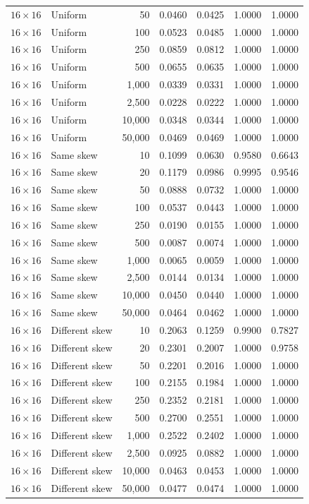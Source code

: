 \begin{longtable}{@{}llrrrrr@{}}
\(16\times16\) & Uniform & 50 & 0.0460 & 0.0425 & 1.0000 & 1.0000\\
\(16\times16\) & Uniform & 100 & 0.0523 & 0.0485 & 1.0000 & 1.0000\\
\(16\times16\) & Uniform & 250 & 0.0859 & 0.0812 & 1.0000 & 1.0000\\
\(16\times16\) & Uniform & 500 & 0.0655 & 0.0635 & 1.0000 & 1.0000\\
\(16\times16\) & Uniform & 1,000 & 0.0339 & 0.0331 & 1.0000 & 1.0000\\
\(16\times16\) & Uniform & 2,500 & 0.0228 & 0.0222 & 1.0000 & 1.0000\\
\(16\times16\) & Uniform & 10,000 & 0.0348 & 0.0344 & 1.0000 & 1.0000\\
\(16\times16\) & Uniform & 50,000 & 0.0469 & 0.0469 & 1.0000 & 1.0000\\
\(16\times16\) & Same skew & 10 & 0.1099 & 0.0630 & 0.9580 & 0.6643\\
\(16\times16\) & Same skew & 20 & 0.1179 & 0.0986 & 0.9995 & 0.9546\\
\(16\times16\) & Same skew & 50 & 0.0888 & 0.0732 & 1.0000 & 1.0000\\
\(16\times16\) & Same skew & 100 & 0.0537 & 0.0443 & 1.0000 & 1.0000\\
\(16\times16\) & Same skew & 250 & 0.0190 & 0.0155 & 1.0000 & 1.0000\\
\(16\times16\) & Same skew & 500 & 0.0087 & 0.0074 & 1.0000 & 1.0000\\
\(16\times16\) & Same skew & 1,000 & 0.0065 & 0.0059 & 1.0000 & 1.0000\\
\(16\times16\) & Same skew & 2,500 & 0.0144 & 0.0134 & 1.0000 & 1.0000\\
\(16\times16\) & Same skew & 10,000 & 0.0450 & 0.0440 & 1.0000 & 1.0000\\
\(16\times16\) & Same skew & 50,000 & 0.0464 & 0.0462 & 1.0000 & 1.0000\\
\(16\times16\) & Different skew & 10 & 0.2063 & 0.1259 & 0.9900 & 0.7827\\
\(16\times16\) & Different skew & 20 & 0.2301 & 0.2007 & 1.0000 & 0.9758\\
\(16\times16\) & Different skew & 50 & 0.2201 & 0.2016 & 1.0000 & 1.0000\\
\(16\times16\) & Different skew & 100 & 0.2155 & 0.1984 & 1.0000 & 1.0000\\
\(16\times16\) & Different skew & 250 & 0.2352 & 0.2181 & 1.0000 & 1.0000\\
\(16\times16\) & Different skew & 500 & 0.2700 & 0.2551 & 1.0000 & 1.0000\\
\(16\times16\) & Different skew & 1,000 & 0.2522 & 0.2402 & 1.0000 & 1.0000\\
\(16\times16\) & Different skew & 2,500 & 0.0925 & 0.0882 & 1.0000 & 1.0000\\
\(16\times16\) & Different skew & 10,000 & 0.0463 & 0.0453 & 1.0000 & 1.0000\\
\(16\times16\) & Different skew & 50,000 & 0.0477 & 0.0474 & 1.0000 & 1.0000\\
\midrule
\bottomrule
\end{longtable}
